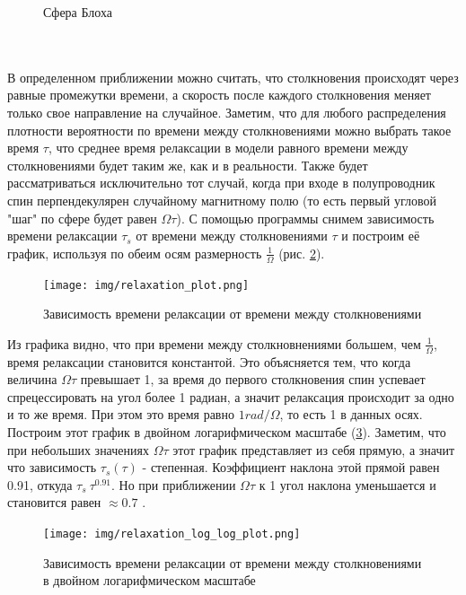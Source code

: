 \documentclass[12pt,oneside]{book}
\begin{document}
{{\begin{figure}[h!]
		\caption{Сфера Блоха}
		\label{fig:f2}
	\end{figure} 
	\\
	\\
 	В определенном приближении можно считать, что столкновения происходят через равные промежутки времени, а скорость после каждого столкновения меняет только свое направление на случайное. Заметим, что для любого распределения плотности вероятности по времени между столкновениями можно выбрать такое время $\tau$, что среднее время релаксации в модели равного времени между столкновениями будет таким же, как и в реальности. Также будет рассматриваться исключительно тот случай, когда при входе в полупроводник спин перпендекулярен случайному магнитному полю (то есть первый угловой "шаг" по сфере будет равен ${\Omega}{\tau}$).
	\newline
	\newline
	С помощью программы снимем зависимость времени релаксации $\tau_s$ от времени между столкновениями $\tau$ и построим её график, используя по обеим осям размерность $\frac{1}{\Omega}$ (рис. \ref{fig:f3}).
	\begin{figure}[h!]
		\centering
		\texttt{[image: img/relaxation\_plot.png]}
		\caption{Зависимость времени релаксации от времени между столкновениями}
		\label{fig:f3}
	\end{figure} 
	Из графика видно, что при времени между столкновнениями большем, чем $\frac{1}{\Omega}$, время релаксации становится константой. Это объясняется тем, что когда величина ${\Omega}{\tau}$ превышает 1, за время до первого столкновения спин успевает спрецессировать на угол более 1 радиан, а значит релаксация происходит за одно и то же время. При этом это время равно  ${1 rad/\Omega}$, то есть 1 в данных осях.
	\newline
	Построим этот график в двойном логарифмическом масштабе (\ref{fig:f4}). Заметим, что при небольших значениях  ${\Omega}{\tau}$ этот график представляет из себя прямую, а значит что зависимость  $\tau_s(\tau)$ - степенная. Коэффициент наклона этой прямой равен 0.91, откуда  $\tau_s ~ \tau^0.91$. Но при приближении ${\Omega}{\tau}$ к 1 угол наклона уменьшается и становится равен $\approx 0.7$ .
	\begin{figure}[h!]
		\centering
		\texttt{[image: img/relaxation\_log\_log\_plot.png]}
		\caption{Зависимость времени релаксации от времени между столкновениями в двойном логарифмическом масштабе}
		\label{fig:f4}
	\end{figure}
}}
\end{document}
